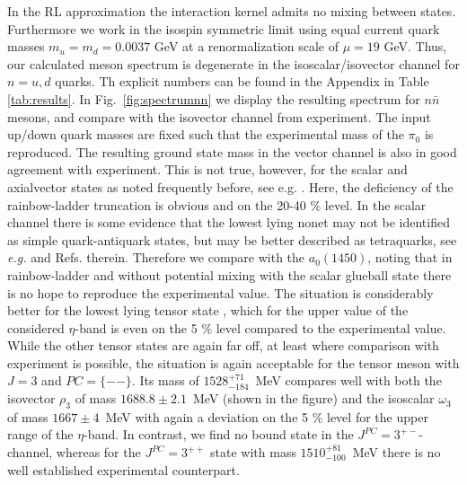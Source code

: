 %
%
%
%
%
%
In the RL approximation the interaction kernel admits no mixing between states. Furthermore
we work in the isospin symmetric limit using equal current quark masses $m_u=m_d=0.0037$ GeV
at a renormalization scale of $\mu = 19$ GeV. Thus, 
our calculated meson spectrum is degenerate in the isoscalar/isovector channel for $n=u,d$ 
quarks. Th explicit numbers can be found in the Appendix in 
Table \ref{tab:results}. In Fig.~\ref{fig:spectrumnn} we 
display the resulting spectrum for $n\bar{n}$ mesons, and compare with the isovector 
channel from experiment. The input up/down quark masses are fixed such that the experimental 
mass of the $\pi_0$ is reproduced. The resulting ground state mass in the vector channel
is also in good agreement with experiment. This is not true, however, for the scalar and 
axialvector states as noted frequently before, see e.g. \cite{Watson:2004kd}. Here, the
deficiency of the rainbow-ladder truncation is obvious and on the 20-40 \% level. In the
scalar channel there is some evidence that the lowest lying nonet may not be identified
as simple quark-antiquark states, but may be better described as tetraquarks, see {\it e.g.}
\cite{Jaffe:1976ig,Giacosa:2006tf,Ebert:2008id,Parganlija:2012fy,Heupel:2012ua} and Refs. 
therein. Therefore we compare with the $a_0(1450)$, noting that in rainbow-ladder and without
potential mixing with the scalar glueball state there is no hope to reproduce the experimental 
value. The situation is considerably better for the lowest lying tensor state \cite{Krassnigg:2010mh}, 
which for the upper value of the considered $\eta$-band is even on the 5 $\%$ level compared
to the experimental value. While the other tensor states are again far off, at least where
comparison with experiment is possible, the situation is again acceptable for the 
tensor meson with $J=3$ and $PC=\{--\}$. Its mass of $1528^{+71}_{-184}$~MeV
compares well with both the isovector $\rho_3$ of mass $1688.8\pm2.1$~MeV (shown in the figure)
and the isoscalar $\omega_3$ of mass $1667\pm4$~MeV with again a deviation on the 5 $\%$ level
for the upper range of the $\eta$-band. In contrast, we find no bound state in the $J^{PC}=3^{+-}$-channel,
whereas for the $J^{PC}=3^{++}$ state with mass $1510^{+81}_{-100}$~MeV there is no well established 
experimental counterpart.

